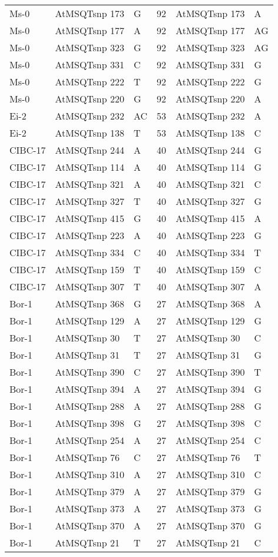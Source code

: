 \begin{center}
\begin{longtable}{|l|l|l|l|l|l|}
Ms-0&AtMSQTsnp 173&G&92&AtMSQTsnp 173&A\\
Ms-0&AtMSQTsnp 177&A&92&AtMSQTsnp 177&AG\\
Ms-0&AtMSQTsnp 323&G&92&AtMSQTsnp 323&AG\\
Ms-0&AtMSQTsnp 331&C&92&AtMSQTsnp 331&G\\
Ms-0&AtMSQTsnp 222&T&92&AtMSQTsnp 222&G\\
Ms-0&AtMSQTsnp 220&G&92&AtMSQTsnp 220&A\\
Ei-2&AtMSQTsnp 232&AC&53&AtMSQTsnp 232&A\\
Ei-2&AtMSQTsnp 138&T&53&AtMSQTsnp 138&C\\
CIBC-17&AtMSQTsnp 244&A&40&AtMSQTsnp 244&G\\
CIBC-17&AtMSQTsnp 114&A&40&AtMSQTsnp 114&G\\
CIBC-17&AtMSQTsnp 321&A&40&AtMSQTsnp 321&C\\
CIBC-17&AtMSQTsnp 327&T&40&AtMSQTsnp 327&G\\
CIBC-17&AtMSQTsnp 415&G&40&AtMSQTsnp 415&A\\
CIBC-17&AtMSQTsnp 223&A&40&AtMSQTsnp 223&G\\
CIBC-17&AtMSQTsnp 334&C&40&AtMSQTsnp 334&T\\
CIBC-17&AtMSQTsnp 159&T&40&AtMSQTsnp 159&C\\
CIBC-17&AtMSQTsnp 307&T&40&AtMSQTsnp 307&A\\
Bor-1&AtMSQTsnp 368&G&27&AtMSQTsnp 368&A\\
Bor-1&AtMSQTsnp 129&A&27&AtMSQTsnp 129&G\\
Bor-1&AtMSQTsnp 30&T&27&AtMSQTsnp 30&C\\
Bor-1&AtMSQTsnp 31&T&27&AtMSQTsnp 31&G\\
Bor-1&AtMSQTsnp 390&C&27&AtMSQTsnp 390&T\\
Bor-1&AtMSQTsnp 394&A&27&AtMSQTsnp 394&G\\
Bor-1&AtMSQTsnp 288&A&27&AtMSQTsnp 288&G\\
Bor-1&AtMSQTsnp 398&G&27&AtMSQTsnp 398&C\\
Bor-1&AtMSQTsnp 254&A&27&AtMSQTsnp 254&C\\
Bor-1&AtMSQTsnp 76&C&27&AtMSQTsnp 76&T\\
Bor-1&AtMSQTsnp 310&A&27&AtMSQTsnp 310&C\\
Bor-1&AtMSQTsnp 379&A&27&AtMSQTsnp 379&G\\
Bor-1&AtMSQTsnp 373&A&27&AtMSQTsnp 373&G\\
Bor-1&AtMSQTsnp 370&A&27&AtMSQTsnp 370&G\\
Bor-1&AtMSQTsnp 21&T&27&AtMSQTsnp 21&C\\

\end{longtable}
\end{center}
